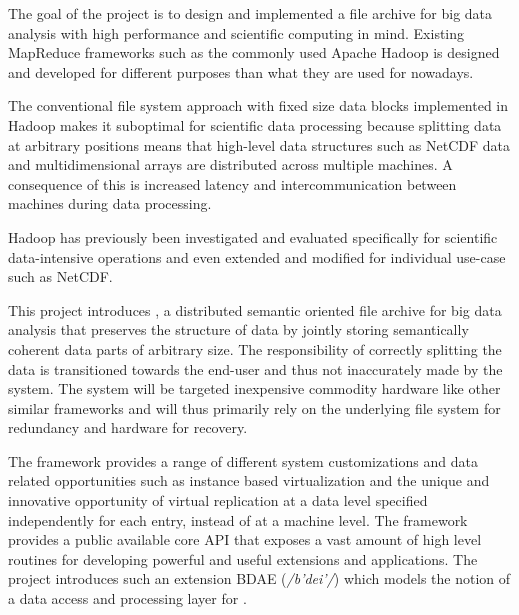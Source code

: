 The goal of the project is to design and implemented a file archive for big data analysis with high performance and scientific computing in mind. Existing MapReduce\cite{Dean:2008:MSD:1327452.1327492} frameworks such as the commonly used Apache Hadoop\cite{PageHadoop} is designed and developed for different purposes than what they are used for nowadays. 

The conventional file system approach with fixed size data blocks implemented in Hadoop makes it suboptimal for scientific data processing because splitting data at arbitrary positions means that high-level data structures such as NetCDF data and multidimensional arrays are distributed across multiple machines. A consequence of this is increased latency and intercommunication between machines during data processing.
\newline

Hadoop has previously been investigated and evaluated speci\-fically for scientific data-intensive operations\cite{fadika2012evaluating} and even extended and modified for individual use-case such as NetCDF\cite{buck2011scihadoop}.
\newline

This project introduces \CodeNameShort, a distributed semantic oriented file archive for big data analysis that preserves the structure of data by jointly storing semantically coherent data parts of arbitrary size. The responsibility of correctly splitting the data is transitioned towards the end-user and thus not inaccurately made by the system. The system will be targeted inexpensive commodity hardware like other similar frameworks and will thus primarily rely on the underlying file system for redundancy and hardware for recovery.
\newline

The \CodeName framework provides a range of different system customizations and data related opportunities such as instance based virtualization and the unique and innovative opportunity of virtual replication at a data level specified independently for each entry, 	instead of at a machine level. The framework provides a public available core API that exposes a vast amount of high level routines for developing powerful and useful extensions and applications. The project introduces such an extension BDAE (\textit{/b'dei'/}) which models the notion of a data access and processing layer for \CodeNameShort.
